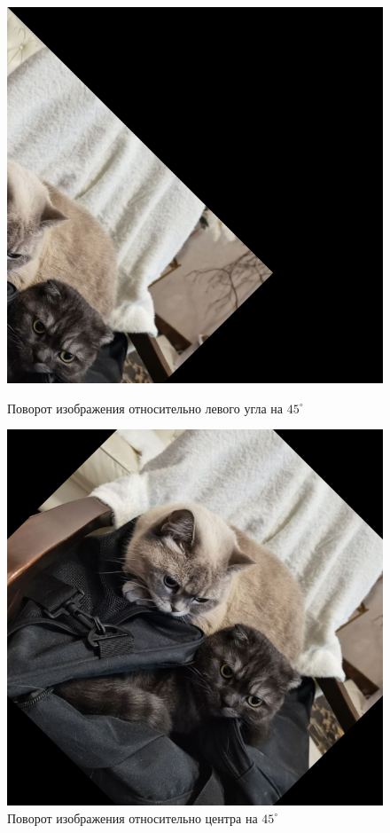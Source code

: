 \documentclass[a4paper, 16pt]{article}
\begin{document}
\begin{figure}[!htb]
    \centering
    \begin{minipage}{0.45\textwidth}
        \centering
        \includegraphics[scale=0.3]{rotated_img.png}
        \captionsetup{skip=0pt}
        \caption{Поворот изображения относительно левого угла на $45^{\circ}$}
        \label{Рис:8}
    \end{minipage}\hfill
    \begin{minipage}{0.45\textwidth}
        \centering
        \includegraphics[scale=0.3]{rotated_img_center.png}
        \captionsetup{skip=0pt}
        \caption{Поворот изображения относительно центра на $45^{\circ}$}
        \label{Рис:9}
    \end{minipage}
\end{figure}
\end{document}
